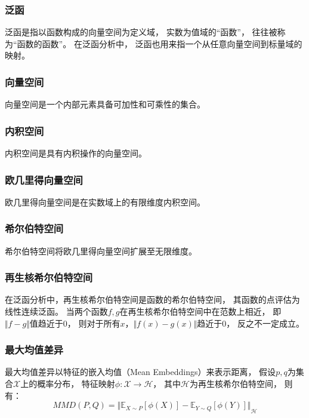 \subsubsection{泛函}
泛函是指以函数构成的向量空间为定义域，
实数为值域的“函数”，
往往被称为“函数的函数”。
在泛函分析中，
泛函也用来指一个从任意向量空间到标量域的映射。


\subsubsection{向量空间}
向量空间是一个内部元素具备可加性和可乘性的集合。

\subsubsection{内积空间}
内积空间是具有内积操作的向量空间。

\subsubsection{欧几里得向量空间}
欧几里得向量空间是在实数域上的有限维度内积空间。

\subsubsection{希尔伯特空间}
希尔伯特空间将欧几里得向量空间扩展至无限维度。

\subsubsection{再生核希尔伯特空间}
在泛函分析中，再生核希尔伯特空间是函数的希尔伯特空间，
其函数的点评估为线性连续泛函。
当两个函数{$f,g$}在再生核希尔伯特空间中在范数上相近，
即{$\Vert f-g \Vert$}值趋近于0，
则对于所有{$x$}，{$\Vert f(x)-g(x) \Vert$}趋近于0，
反之不一定成立。

\subsubsection{最大均值差异}
最大均值差异以特征的嵌入均值（Mean Embeddings）来表示距离，
假设{$p,q$}为集合{$\mathcal{X}$}上的概率分布，
特征映射{$\phi: \mathcal{X} \rightarrow \mathcal{H} $}，
其中{$\mathcal{H}$}为再生核希尔伯特空间，
则有：
\begin{equation}
    \label{eq:maximux_mean_distance}
    MMD(P,Q)= {\Vert \mathbb{E}_{X \sim P}[\phi(X)] -  \mathbb{E}_{Y \sim Q}[\phi(Y)] \Vert}_{\mathcal{H}}
\end{equation}

